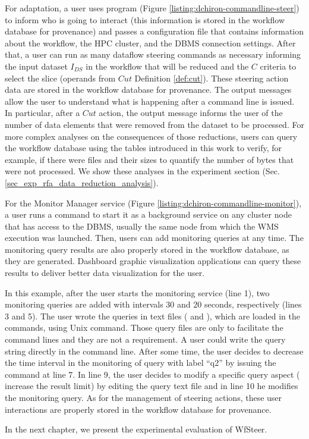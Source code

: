 For adaptation, a user uses  program (Figure \ref{listing:dchiron-commandline-steer}) to inform  who is going to
interact (this information
is stored in the workflow database for provenance) and passes a configuration
file that contains information about the workflow, the HPC cluster, and
the DBMS connection settings. After that, a user can run as many
dataflow steering commands as necessary informing the input dataset
$I_{DS}$ in the workflow that will be reduced and the $C$ criteria
to select the slice (operands from $Cut$ Definition \ref{def:cut}).
These steering action data are stored in the workflow database for provenance. The
output messages allow the user to understand what is
happening after a command line is issued. In particular, after a
$Cut$ action, the output message informs the user of the
number of data elements that were removed from the dataset to be
processed. For more complex analyses on the consequences of those
reductions, users can query the workflow database using the tables introduced
in this work to verify, for example, if there were files and their sizes
to quantify the number of bytes that were not processed.
We show these analyses in the experiment section (Sec. \ref{sec_exp_rfa_data_reduction_analysis}).



For the Monitor Manager service (Figure \ref{listing:dchiron-commandline-monitor}), a user runs a command to start it
 as a background service on any cluster node that has
access to the DBMS, usually the same node from which the WMS execution
was launched. Then, users can add monitoring queries at any time. The
monitoring query results are also properly stored in the workflow database, as
they are generated. Dashboard graphic visualization applications can
query these results to deliver better data visualization for the user.






In this example, after the user starts the monitoring service (line 1),
two monitoring queries are added with intervals 30 and 20 seconds,
respectively (lines 3 and 5). The user wrote the queries in text files
( and ), which are loaded in the
 commands,
using  Unix command. Those query files are only to facilitate the
command lines and they are not a requirement. A user could write the
query string directly in the command line. After some time, the user decides
to decrease the time interval in the monitoring of query with label
``q2'' by issuing the command at line 7. In line 9, the user decides to modify a
specific query aspect (\eg{} increase the result limit) by
editing the query text file and in line 10 he modifies the monitoring
query. As for the management of steering actions, these user interactions are properly stored in the workflow database for
provenance.

In the next chapter, we present the experimental evaluation of WfSteer.